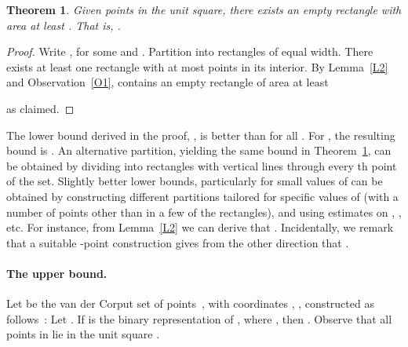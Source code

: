 \documentclass[11pt]{article}
\newtheorem{theorem}{Theorem}
\begin{document}
\begin{theorem} \label{T2}
Given  points in the unit square, there exists an empty rectangle
with area at least . 
That is, . 
\end{theorem}
\begin{proof}
Write , for some  and . 
Partition  into  rectangles of equal width. There exists
at least one rectangle  with at most  points in its interior. 
By Lemma~\ref{L2} and Observation~\ref{O1}, 
 contains an empty rectangle of area at least

as claimed.
\end{proof}


The lower bound derived in the proof, , is
better than  for all . For ,
the resulting bound is . 
An alternative partition, yielding the same bound in Theorem~\ref{T2},
can be obtained by dividing  into rectangles with vertical lines
through every th point of the set. Slightly better lower
bounds, particularly 
for small values of  can be obtained by constructing different
partitions tailored for specific values of  (with a number of
points other than  in a few of the rectangles), and using estimates
on , , etc.  For instance, from Lemma~\ref{L2} we can derive that 
. 
Incidentally, we remark that a suitable -point construction gives
from the other direction that . 


\paragraph{The upper bound.}
Let  be the van der Corput set of  points~\cite{C35a,C35b},
with coordinates , , constructed as
follows~\cite{Ch00,Ma99}: Let .
If  is the binary representation of ,
where , then .
Observe that all points in  lie in the unit square .
\end{document}
